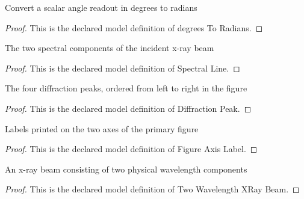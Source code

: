 \begin{definition}
  \label{def:physics:phyx-mini-0081:phyxminiproblems-problemphyxmini0081-degreestoradians}
  Convert a scalar angle readout in degrees to radians
\end{definition}
\begin{proof}
  This is the declared model definition of degrees To Radians.
\end{proof}
\begin{definition}
  \label{def:physics:phyx-mini-0081:phyxminiproblems-problemphyxmini0081-spectralline}
  The two spectral components of the incident x-ray beam
\end{definition}
\begin{proof}
  This is the declared model definition of Spectral Line.
\end{proof}
\begin{definition}
  \label{def:physics:phyx-mini-0081:phyxminiproblems-problemphyxmini0081-diffractionpeak}
  The four diffraction peaks, ordered from left to right in the figure
\end{definition}
\begin{proof}
  This is the declared model definition of Diffraction Peak.
\end{proof}
\begin{definition}
  \label{def:physics:phyx-mini-0081:phyxminiproblems-problemphyxmini0081-figureaxislabel}
  Labels printed on the two axes of the primary figure
\end{definition}
\begin{proof}
  This is the declared model definition of Figure Axis Label.
\end{proof}
\begin{definition}
  \label{def:physics:phyx-mini-0081:phyxminiproblems-problemphyxmini0081-twowavelengthxraybeam}
  An x-ray beam consisting of two physical wavelength components
\end{definition}
\begin{proof}
  This is the declared model definition of Two Wavelength XRay Beam.
\end{proof}

